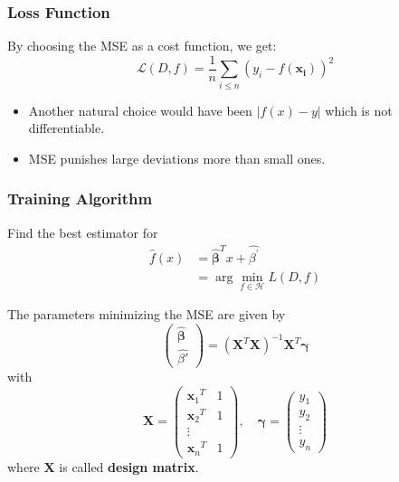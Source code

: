 \subsubsection{Loss Function}
By choosing the MSE as a cost function, we get:
\begin{equation*}
    \mathcal{L}(D,f)=\frac{1}{n}\sum_{i\leq n}{\left(y_i-f(\mathbf{x_i})\right)}^2
\end{equation*}

\begin{itemize}
    \item Another natural choice would have been $|f(x)-y|$ which is not differentiable.
    \item MSE punishes large deviations more than small ones.
\end{itemize}

\subsubsection{Training Algorithm}
Find the best estimator for
\begin{align*}
    \hat{f}(x) & =\hat{\boldsymbol{\beta}}^T x+\widehat{\beta^{\prime}} \\
               & =\arg\min_{f\in\mathcal{H}}L(D,f)
\end{align*}


The parameters minimizing the MSE are given by
\begin{equation*}
    \begin{pmatrix}
        \hat{\boldsymbol{\beta}} \\
        \widehat{\beta'}
    \end{pmatrix}
    ={(\mathbf{X}^T \mathbf{X})}^{-1}\mathbf{X}^T\boldsymbol{\gamma}
\end{equation*}
with
\begin{equation*}
    \mathbf{X}=
    \begin{pmatrix}
        {\mathbf{x}_1}^T & 1 \\
        {\mathbf{x}_2}^T & 1 \\
        \vdots               \\
        {\mathbf{x}_n}^T & 1
    \end{pmatrix},\quad
    \boldsymbol{\gamma}=
    \begin{pmatrix}
        y_1    \\
        y_2    \\
        \vdots \\
        y_n
    \end{pmatrix}
\end{equation*}
where $\mathbf{X}$ is called \textbf{design matrix}.

